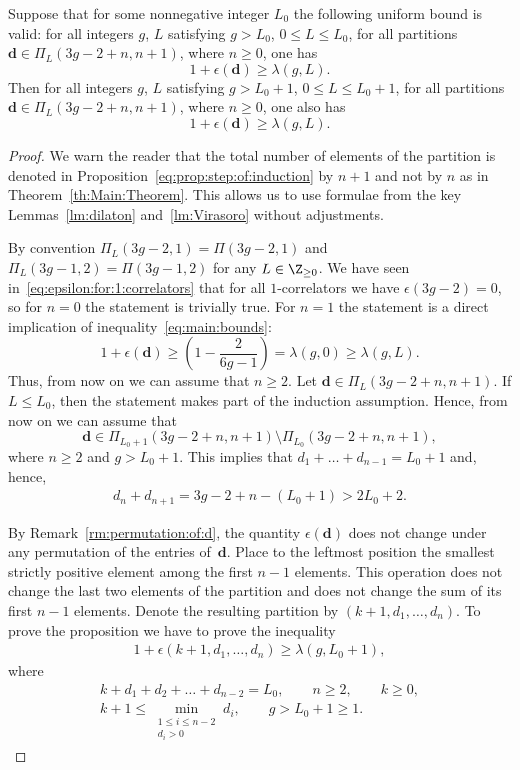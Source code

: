 \begin{Proposition} \label{eq:prop:step:of:induction}
Suppose that for some nonnegative integer $L_0$
the following uniform bound is valid:
for all integers $g$, $L$ satisfying $g> L_0$, $0\le L\le L_0$,
for all partitions $\boldsymbol{d}\in\Pi_L(3g-2+n,n+1)$,
where $n\ge 0$, one has
\[
1+\epsilon(\boldsymbol{d})\ge \lambda(g,L) .
\]
Then for all integers $g$, $L$
satisfying $g> L_0+1$,
$0\le L\le L_0+1$,
for all partitions $\boldsymbol{d}\in\Pi_L(3g-2+n,n+1)$,
where $n\ge 0$, one also has
\[
1+\epsilon(\boldsymbol{d})\ge \lambda(g,L) .
\]
\end{Proposition}

\begin{proof}
We warn the reader that the total number of elements of the
partition is denoted in
Proposition~\ref{eq:prop:step:of:induction} by $n+1$ and
not by $n$ as in Theorem~\ref{th:Main:Theorem}. This allows
us to use formulae from the key Lemmas~\ref{lm:dilaton}
and~\ref{lm:Virasoro} without adjustments.

By convention $\Pi_L(3g-2,1)=\Pi(3g-2,1)$ and
$\Pi_L(3g-1,2)=\Pi(3g-1,2)$ for any $L\in\Z_{\ge 0}$.
We have seen in~\eqref{eq:epsilon:for:1:correlators}
that for all $1$-correlators we have
$\epsilon(3g-2)=0$,
so for $n=0$ the statement is trivially true.
For $n=1$ the statement is a direct implication
of inequality~\eqref{eq:main:bounds}:
\[
1+\epsilon(\boldsymbol{d})
\ge \left(1-\frac{2}{6g-1}\right)
=\lambda(g,0)
\ge\lambda(g,L) .
\]
Thus, from now on we can assume that $n\ge 2$. Let $\boldsymbol{d}\in\Pi_L(3g-2+n,n+1)$. If $L\le L_0$, then the statement makes part of the induction assumption. Hence, from now on we can assume that
\[
\boldsymbol{d}\in\Pi_{L_0+1}(3g-2+n,n+1)\setminus\Pi_{L_0}(3g-2+n,n+1) ,
\]
where $n\ge 2$ and $g> L_0+1$. This implies that
$d_1+\dots+d_{n-1}=L_0+1$ and, hence,
\begin{gather*}%
d_{n}+d_{n+1}=3g-2+n-(L_0+1)> 2L_0+2 .
\end{gather*}

By Remark~\ref{rm:permutation:of:d}, the quantity $\epsilon(\boldsymbol{d})$ does not change under any permutation of the entries of~$\boldsymbol{d}$. Place to the leftmost position the smallest strictly positive element among the first $n-1$ elements. This operation does not change the last two elements of the partition and does not change the sum of its first $n-1$ elements. Denote the resulting partition by $(k+1,d_1,\dots,d_n)$. To prove the proposition we have to prove the inequality
\begin{gather}\label{eq:desired:inequality}
1+\epsilon(k+1,d_1,\dots,d_n)\ge \lambda(g,L_0+1) ,
\end{gather}
where
\begin{gather}
k+d_1+d_2+\dots+d_{n-2}=L_0 ,\qquad n\ge 2,\qquad k\ge 0 ,\nonumber\\
 k+1\le\min_{\substack{1\le i\le n-2\\d_i>0}} d_i ,\qquad g>L_0+1\ge 1 .\label{eq:restrictions}
\end{gather}


\end{proof}
